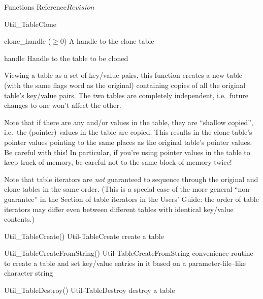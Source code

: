 \begin{cactuspart}{ Functions Reference}{}{$Revision$}
\begin{FunctionDescription}{Util\_TableClone}
\begin{ResultSection}
\begin{Result}{clone\_handle ($\ge 0$)}
A handle to the clone table
\end{Result}
\end{ResultSection}

\begin{ParameterSection}
\begin{Parameter}{handle}
Handle to the table to be cloned
\end{Parameter}
\end{ParameterSection}

\begin{Discussion}
Viewing a table as a set of key/value pairs, this function creates
a new table (with the same flags word as the original) containing
copies of all the original table's key/value pairs.  The two tables
are completely independent, i.e.\ future changes to one won't affect
the other.

Note that if there are any  and/or 
values in the table, they are ``shallow copied'', i.e.\ the (pointer)
values in the table are copied.  This results in the clone table's
pointer values pointing to the same places as the original table's
pointer values.  Be careful with this!  In particular,
if you're using pointer values in the table to keep track of
 memory, be careful not to 
the same block of memory twice!

Note that table iterators are {\em not\/} guaranteed to sequence
through the original and clone tables in the same order.  (This
is a special case of the more general ``non-guarantee'' in
the Section of table iterators in the Users' Guide:
the order of table iterators may differ even between different
tables with identical key/value contents.)
\end{Discussion}

\begin{SeeAlsoSection}
\begin{SeeAlso2} {Util\_TableCreate()} {Util-TableCreate}
create a table
\end{SeeAlso2}
\begin{SeeAlso2} {Util\_TableCreateFromString()} {Util-TableCreateFromString}
convenience routine to create a table and set key/value entries
in it based on a parameter-file--like character string
\end{SeeAlso2}
\begin{SeeAlso2} {Util\_TableDestroy()} {Util-TableDestroy}
destroy a table
\end{SeeAlso2}
\end{SeeAlsoSection}


\end{FunctionDescription}
\end{cactuspart}
